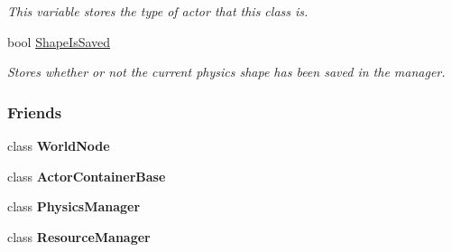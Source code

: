 \begin{DoxyCompactItemize}
\begin{DoxyCompactList}\small\item\em This variable stores the type of actor that this class is. \item\end{DoxyCompactList}\item 
\hypertarget{classphys_1_1ActorBase_a22c0ab01bdc3e1e5c656fb0f201f6929}{
bool \hyperlink{classphys_1_1ActorBase_a22c0ab01bdc3e1e5c656fb0f201f6929}{ShapeIsSaved}}
\label{d8/d0f/classphys_1_1ActorBase_a22c0ab01bdc3e1e5c656fb0f201f6929}

\begin{DoxyCompactList}\small\item\em Stores whether or not the current physics shape has been saved in the manager. \item\end{DoxyCompactList}\end{DoxyCompactItemize}
\subsubsection*{Friends}
\begin{DoxyCompactItemize}
\item 
\hypertarget{classphys_1_1ActorBase_a1cacd07efb11226da49a7c80569b18e8}{
class {\bfseries WorldNode}}
\label{d8/d0f/classphys_1_1ActorBase_a1cacd07efb11226da49a7c80569b18e8}

\item 
\hypertarget{classphys_1_1ActorBase_a54042fcfa7ab444a50ec79cbe3395356}{
class {\bfseries ActorContainerBase}}
\label{d8/d0f/classphys_1_1ActorBase_a54042fcfa7ab444a50ec79cbe3395356}

\item 
\hypertarget{classphys_1_1ActorBase_a139cf05ac01161b7071c8a037c841683}{
class {\bfseries PhysicsManager}}
\label{d8/d0f/classphys_1_1ActorBase_a139cf05ac01161b7071c8a037c841683}

\item 
\hypertarget{classphys_1_1ActorBase_a54c1252abc87a78a301e6b6984470408}{
class {\bfseries ResourceManager}}
\label{d8/d0f/classphys_1_1ActorBase_a54c1252abc87a78a301e6b6984470408}

\end{DoxyCompactItemize}


